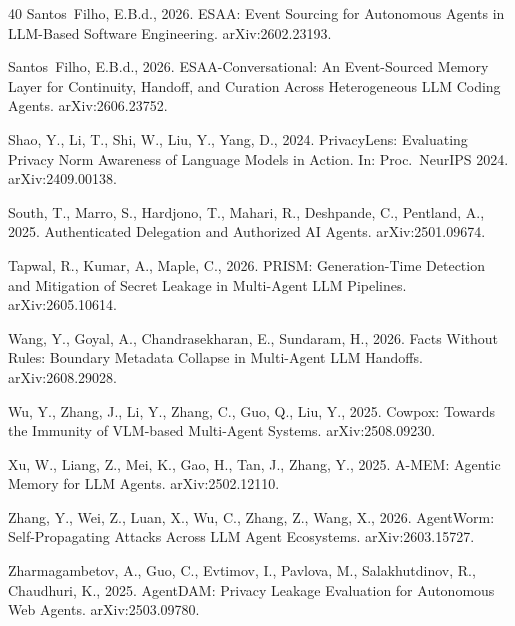 \documentclass[preprint,12pt,authoryear]{elsarticle}
\begin{document}
\begin{thebibliography}{40}
Santos~Filho, E.B.d., 2026{}. ESAA: Event Sourcing for Autonomous Agents in LLM-Based Software Engineering. arXiv:2602.23193.

Santos~Filho, E.B.d., 2026{}. ESAA-Conversational: An Event-Sourced Memory Layer for Continuity, Handoff, and Curation Across Heterogeneous LLM Coding Agents. arXiv:2606.23752.

Shao, Y., Li, T., Shi, W., Liu, Y., Yang, D., 2024. PrivacyLens: Evaluating Privacy Norm Awareness of Language Models in Action. In: Proc.\ NeurIPS 2024. arXiv:2409.00138.

South, T., Marro, S., Hardjono, T., Mahari, R., Deshpande, C., Pentland, A., 2025. Authenticated Delegation and Authorized AI Agents. arXiv:2501.09674.

Tapwal, R., Kumar, A., Maple, C., 2026. PRISM: Generation-Time Detection and Mitigation of Secret Leakage in Multi-Agent LLM Pipelines. arXiv:2605.10614.

Wang, Y., Goyal, A., Chandrasekharan, E., Sundaram, H., 2026. Facts Without Rules: Boundary Metadata Collapse in Multi-Agent LLM Handoffs. arXiv:2608.29028.

Wu, Y., Zhang, J., Li, Y., Zhang, C., Guo, Q., Liu, Y., 2025. Cowpox: Towards the Immunity of VLM-based Multi-Agent Systems. arXiv:2508.09230.

Xu, W., Liang, Z., Mei, K., Gao, H., Tan, J., Zhang, Y., 2025. A-MEM: Agentic Memory for LLM Agents. arXiv:2502.12110.

Zhang, Y., Wei, Z., Luan, X., Wu, C., Zhang, Z., Wang, X., 2026. AgentWorm: Self-Propagating Attacks Across LLM Agent Ecosystems. arXiv:2603.15727.

Zharmagambetov, A., Guo, C., Evtimov, I., Pavlova, M., Salakhutdinov, R., Chaudhuri, K., 2025. AgentDAM: Privacy Leakage Evaluation for Autonomous Web Agents. arXiv:2503.09780.

\end{thebibliography}
\end{document}
